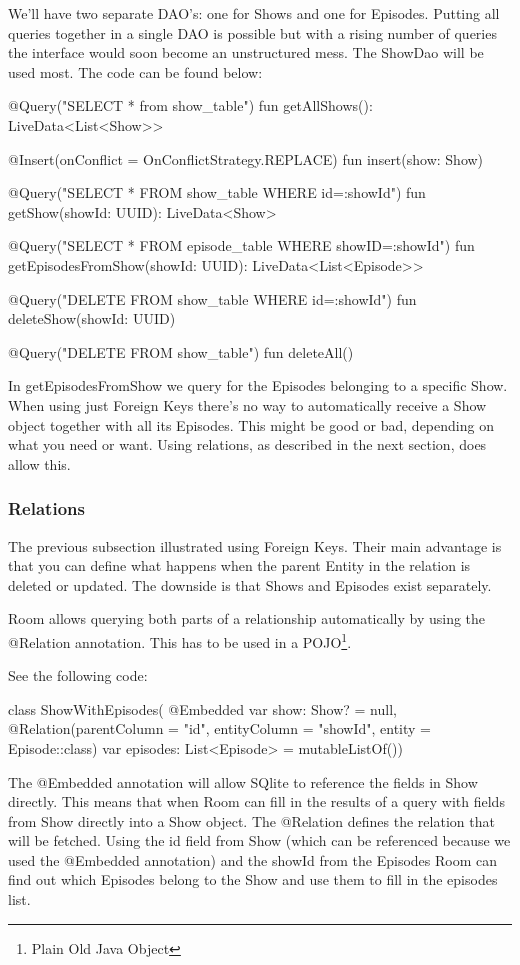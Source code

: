 We'll have two separate DAO's: one for Shows and one for Episodes.
Putting all queries together in a single DAO is possible but with a rising number of queries the interface would soon become an unstructured mess.
The ShowDao will be used most. The code can be found below:
\begin{android}
@Query("SELECT * from show_table")
fun getAllShows(): LiveData<List<Show>>

@Insert(onConflict = OnConflictStrategy.REPLACE)
fun insert(show: Show)

@Query("SELECT * FROM show_table WHERE id=:showId")
fun getShow(showId: UUID): LiveData<Show>

@Query("SELECT * FROM episode_table WHERE showID=:showId")
fun getEpisodesFromShow(showId: UUID): LiveData<List<Episode>>

@Query("DELETE FROM show_table WHERE id=:showId")
fun deleteShow(showId: UUID)

@Query("DELETE FROM show_table")
fun deleteAll()	
\end{android}

In getEpisodesFromShow we query for the Episodes belonging to a specific Show.
When using just Foreign Keys there's no way to automatically receive a Show object together with all its Episodes.
This might be good or bad, depending on what you need or want.
Using relations, as described in the next section, does allow this.

\subsubsection{Relations}
The previous subsection illustrated using Foreign Keys.
Their main advantage is that you can define what happens when the parent Entity in the relation is deleted or updated.
The downside is that Shows and Episodes exist separately.

Room allows querying both parts of a relationship automatically by using the @Relation annotation.
This has to be used in a POJO\footnote{Plain Old Java Object}.

See the following code:
\begin{android}
class ShowWithEpisodes(
	@Embedded
	var show: Show? = null,
	@Relation(parentColumn = "id", entityColumn = "showId", entity = Episode::class)
	var episodes: List<Episode> = mutableListOf())
\end{android}

The @Embedded annotation will allow SQlite to reference the fields in Show directly.
This means that when Room can fill in the results of a query with fields from Show directly into a Show object.
The @Relation defines the relation that will be fetched.
Using the id field from Show (which can be referenced because we used the @Embedded annotation) and the showId from the Episodes Room can find out which Episodes belong to the Show and use them to fill in the episodes list.

